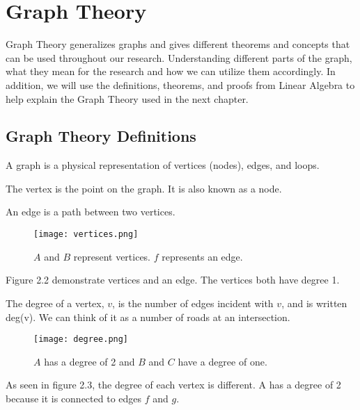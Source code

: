 \section{Graph Theory}
Graph Theory generalizes graphs and gives different theorems and concepts that can be used throughout our research.  Understanding different parts of the graph, what they mean for the research and how we can utilize them accordingly. In addition, we will use the definitions, theorems, and proofs from Linear Algebra to help explain the Graph Theory used in the next chapter.  

\cite{Graph_Theory}
\subsection{Graph Theory Definitions} %
\begin{definition}[Graph]
    A graph is a physical representation of vertices (nodes), edges, and loops.
\end{definition}

\begin{definition}[Vertex]
    The vertex is the point on the graph.  It is also known as a node.  
\end{definition}

\begin{definition}[Edge]
    An edge is a path between two vertices.  
\end{definition}

\begin{figure}[h]
         \centering
         \texttt{[image: vertices.png]}
         \caption{\small{$A$ and $B$ represent vertices. $f$ represents an edge.}}
 \end{figure}
Figure 2.2 demonstrate vertices and an edge.  The vertices both have degree 1.  
\begin{definition}[Degree]
    The degree of a vertex, $v$, is the number of edges incident with $v$, and is written deg(v). We can think of it as a number of roads at an intersection.\\
\end{definition}

\begin{figure}[h]
         \centering
         \texttt{[image: degree.png]}
         \caption{\small{$A$ has a degree of 2 and $B$ and $C$ have a degree of one.}}
 \end{figure}
\par As seen in figure 2.3, the degree of each vertex is different.  A has a degree of 2 because it is connected to edges $f$ and $g$. 

